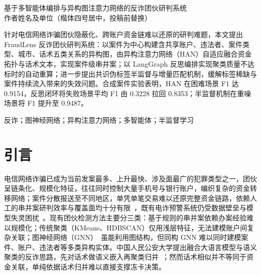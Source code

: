 \documentclass[12pt,a4paper,fontset=windows]{ctexart}
\begin{document}
\vspace*{-1.2cm}
\begin{center}
  {\heiti{} 基于多智能体编排与异构图注意力网络的反诈团伙研判系统}\\[6pt]
  {\kaishu{} 作者姓名及单位（楷体四号居中，投稿前替换）}
\end{center}
\vspace{6pt}

针对电信网络诈骗团伙隐蔽化、跨账户资金链难以还原的研判难题，本文提出 FraudLens 反诈团伙研判系统：以案件为中心构建含共享账户、违法者、案件类型、城市、话术五类关系的异构图，由异构注意力网络（HAN）自适应融合资金拓扑与话术文本，实现案件级串并案；以 LangGraph 反思编排实现聚类质量不达标时的自动重算；进一步提出共识伪标签半监督与增量匹配机制，缓解标签稀缺与案件持续流入带来的失效问题。合成案件实验表明，HAN 在困难场景 F1 达 0.9154，反思闭环将失败场景平均 F1 由 0.3228 拉回 0.8353；半监督机制在重噪场景将 F1 提升至 0.9487。\par

 反诈；图神经网络；异构注意力网络；多智能体；半监督学习

\section*{引言}

电信网络诈骗已成为当前发案最多、上升最快、涉及面最广的犯罪类型之一，团伙呈链条化、规模化特征，往往同时控制大量手机号与银行账户，编织复杂的资金转移网络；案件分散报送至不同地区，单凭单笔交易难以还原完整资金链路，依赖人工的串并案研判效率与覆盖面均十分有限~\cite{wu2023moneylaunder}，既有电诈预警系统仍受数据壁垒与模型失灵困扰~\cite{zhuang2025warning}。现有团伙检测方法主要分三类：基于规则的串并案依赖办案经验难以规模化；传统聚类（KMeans、HDBSCAN）仅用浅层特征，无法建模账户间复杂关联；图神经网络（GNN）~\cite{kipf2017gcn,hamilton2017graphsage,zhang2024ciesgnn}虽能利用图结构，但同构 GNN 难以同时建模案件、账户、违法者等多类异构实体。中国人民公安大学提出融合大语言模型与语义聚类的反诈思路，先对话术做语义嵌入再聚类归并~\cite{shi2025llmsemantic}；然而话术相似并不等同于资金关联，单纯依据话术归并难以直接支撑冻卡决策。
\end{document}
